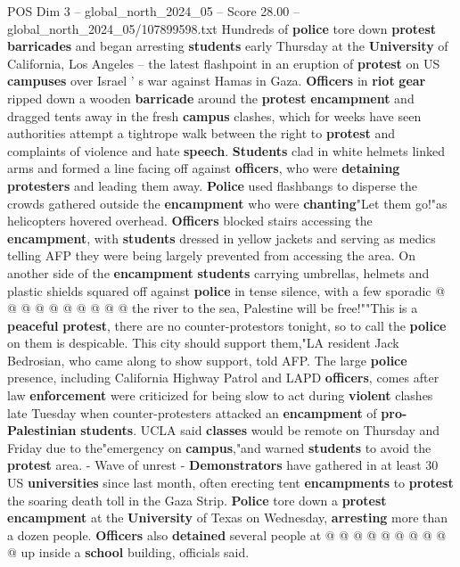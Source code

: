 \begin{textsample}{POS Dim 3 – global\_north\_2024\_05 – Score 28.00 – global\_north\_2024\_05/107899598.txt}  \label{ex:f3_pos_006}
Hundreds of \textbf{police} tore down \textbf{protest} \textbf{barricades} and began arresting \textbf{students} early Thursday at the \textbf{University} of California, Los Angeles -- the latest flashpoint in an eruption of \textbf{protest} on US \textbf{campuses} over Israel ' s war against Hamas in Gaza. \textbf{Officers} in \textbf{riot} \textbf{gear} ripped down a wooden \textbf{barricade} around the \textbf{protest} \textbf{encampment} and dragged tents away in the fresh \textbf{campus} clashes, which for weeks have seen authorities attempt a tightrope walk between the right to \textbf{protest} and complaints of violence and hate \textbf{speech}. \textbf{Students} clad in white helmets linked arms and formed a line facing off against \textbf{officers}, who were \textbf{detaining} \textbf{protesters} and leading them away. \textbf{Police} used flashbangs to disperse the crowds gathered outside the \textbf{encampment} who were \textbf{chanting}"Let them go!"as helicopters hovered overhead. \textbf{Officers} blocked stairs accessing the \textbf{encampment}, with \textbf{students} dressed in yellow jackets and serving as medics telling AFP they were being largely prevented from accessing the area.
On another side of the \textbf{encampment} \textbf{students} carrying umbrellas, helmets and plastic shields squared off against \textbf{police} in tense silence, with a few sporadic @ @ @ @ @ @ @ @ @ @ the river to the sea, Palestine will be free!""This is a \textbf{peaceful} \textbf{protest}, there are no counter-protestors tonight, so to call the \textbf{police} on them is despicable.
This city should support them,"LA resident Jack Bedrosian, who came along to show support, told AFP.
The large \textbf{police} presence, including California Highway Patrol and LAPD \textbf{officers}, comes after law \textbf{enforcement} were criticized for being slow to act during \textbf{violent} clashes late Tuesday when counter-protesters attacked an \textbf{encampment} of \textbf{pro-Palestinian} \textbf{students}.
UCLA said \textbf{classes} would be remote on Thursday and Friday due to the"emergency on \textbf{campus},"and warned \textbf{students} to avoid the \textbf{protest} area. - Wave of unrest - \textbf{Demonstrators} have gathered in at least 30 US \textbf{universities} since last month, often erecting tent \textbf{encampments} to \textbf{protest} the soaring death toll in the Gaza Strip. \textbf{Police} tore down a \textbf{protest} \textbf{encampment} at the \textbf{University} of Texas on Wednesday, \textbf{arresting} more than a dozen people. \textbf{Officers} also \textbf{detained} several people at @ @ @ @ @ @ @ @ @ @ up inside a \textbf{school} building, officials said.

\end{textsample}
